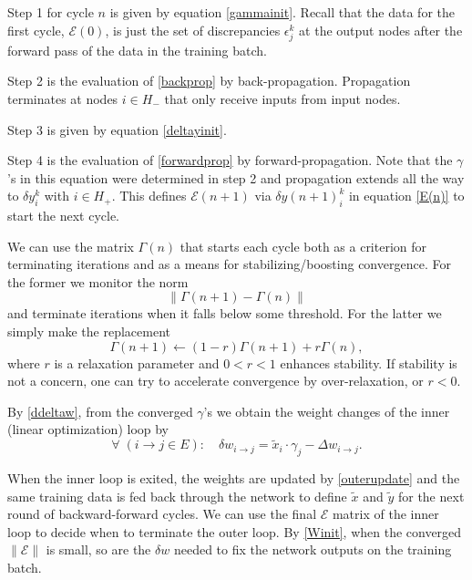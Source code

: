 \documentclass[12pt]{article}
\begin{document}
Step 1 for cycle $n$ is given by equation \eqref{gammainit}. Recall that the data for the first cycle, $\mathcal{E}(0)$, is just the set of discrepancies $\epsilon^k_j$ at the output nodes after the forward pass of the data in the training batch.

Step 2 is the evaluation of \eqref{backprop} by back-propagation. Propagation terminates at nodes $i\in H_-$ that only receive inputs from input nodes.

Step 3 is given by equation \eqref{deltayinit}.

Step 4 is the evaluation of \eqref{forwardprop} by forward-propagation. Note that the $\gamma$'s in this equation were determined in step 2 and propagation extends all the way to $\delta y^k_i$ with $i\in H_+$. This defines $\mathcal{E}(n+1)$ via $\delta y(n+1)^k_i$ in equation \eqref{E(n)} to start the next cycle.

We can use the matrix $\Gamma(n)$ that starts each cycle both as a criterion for terminating iterations and as a means for stabilizing/boosting convergence. For the former we monitor the norm
\begin{equation}
\|\Gamma(n+1)-\Gamma(n)\|
\end{equation}
and terminate iterations when it falls below some threshold. For the latter we simply make the replacement
\begin{equation}
\Gamma(n+1)\leftarrow (1-r)\Gamma(n+1)+r \Gamma(n),
\end{equation}
where $r$ is a relaxation parameter and $0<r<1$ enhances stability. If stability is not a concern, one can try to accelerate convergence by over-relaxation, or $r<0$.

By \eqref{ddeltaw}, from the converged $\gamma$'s we obtain the weight changes of the inner (linear optimization) loop by
\begin{equation}
\forall\; (i\to j\in E):\quad \delta w_{i\to j}=\tilde{x}_i\cdot\gamma_j -\Delta w_{i\to j}.
\end{equation}

When the inner loop is exited, the weights are updated by \eqref{outerupdate} and the same training data is fed back through the network to define $\tilde{x}$ and $\tilde{y}$ for the next round of backward-forward cycles. We can use the final $\mathcal{E}$ matrix of the inner loop to decide when to terminate the outer loop. By \eqref{Winit}, when the converged $\|\mathcal{E}\|$ is small, so are the $\delta w$ needed to fix the network outputs on the training batch.
\end{document}
